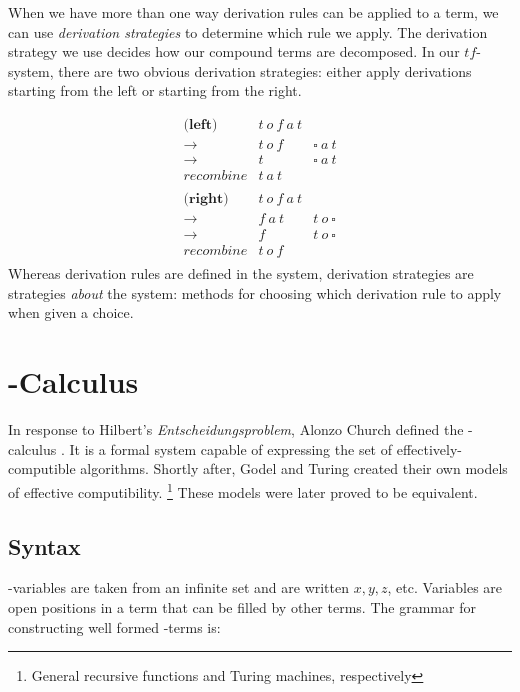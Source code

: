 When we have more than one way derivation rules can be applied to a term,
we can use \emph{derivation strategies} to determine which rule we apply.
The derivation strategy we use decides how our compound terms are decomposed.
In our $tf$-system, there are two obvious derivation strategies:
either apply derivations starting from the left or starting from the right.

\[
\begin{array}{rcl}
  
  \textbf{(left)} & t\ o\ f\ a\ t \\
  \to                & t\ o\ f & \square\ a\ t \\
  \to                & t       & \square\ a\ t \\
  \textit{recombine} & t\ a\ t & \\
  \\
  \textbf{(right)}   & t\ o\ f\ a\ t \\
  \to                & f\ a\ t & t\ o\ \square \\
  \to                & f       & t\ o\ \square \\
  \textit{recombine} & t\ o\ f & \\
  
\end{array}
\]
Whereas derivation rules are defined in the system, 
derivation strategies are strategies \emph{about} the system: methods for choosing which derivation rule to apply when given a choice. 

\section{\lam-Calculus}

In response to Hilbert's \emph{Entscheidungsproblem}, Alonzo Church defined the \lam-calculus \cite{ChurchEnt36}. 
It is a formal system capable of expressing the set of effectively-computible algorithms.
Shortly after, Godel and Turing created their own models of effective computibility.
\footnote{General recursive functions and Turing machines, respectively} 
These models were later proved to be equivalent.

\subsection{Syntax}
  
  \lam-variables are taken from an infinite set and are written $x,y,z$, etc. Variables are open positions in a term that can be filled by other terms.
  The grammar for constructing well formed \lam-terms is:

